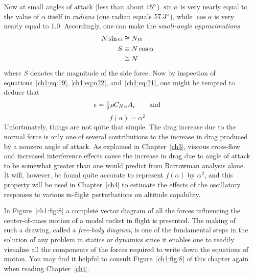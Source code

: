 Now at small angles of attack (less than about $15^{\circ}$) $\sin\alpha$ is very
nearly equal to the value of $\alpha$ itself in \emph{radians} (one radian
equals $57.3^{\circ}$), while $\cos\alpha$ is very nearly equal to 1.0. Accordingly,
one can make the \emph{small-angle approximations}
\begin{align}
N\sin\alpha &\cong N\alpha \label{ch1:eq:21}\\
S &\equiv N\cos\alpha \label{ch1:eq:22}\\
  &\cong N \notag
\end{align}
where $S$ denotes the magnitude of the side force. Now by inspection of
equations~\eqref{ch1:eq:19}, \eqref{ch1:eq:n22}, and~\eqref{ch1:eq:21}, one
might be tempted to deduce that
\begin{equation*}
\epsilon = \tfrac{1}{2}\rho C_{N\alpha} A_r \qquad \text{and}
\end{equation*}
\begin{equation*}
f(\alpha) = \alpha^{2}
\end{equation*}
Unfortunately, things are not quite that simple. The drag increase due to the
normal force is only one of several contributions to the increase in drag
produced by a nonzero angle of attack. As explained in Chapter~\ref{ch3},
viscous cross-flow and increased interference effects cause the increase in
drag due to angle of attack to be somewhat greater than one would predict from
Barrowman analysis alone. It will, however, be found quite accurate to
represent $f(\alpha)$ by $\alpha^{2}$, and this property will be used in
Chapter~\ref{ch4} to estimate the effects of the oscillatory responses to
various in-flight perturbations on altitude capability.

In Figure~\ref{ch1:fig:8} a complete vector diagram of all the forces
influencing the center-of-mass motion of a model rocket in flight is presented.
The making of such a drawing, called a \emph{free-body diagram}, is one of the
fundamental steps in the solution of any problem in statics or dynamics since
it enables one to readily visualize all the components of the forces required
to write down the equations of motion. You may find it helpful to consult
Figure~\ref{ch1:fig:8} of this chapter again when reading Chapter~\ref{ch4}.

